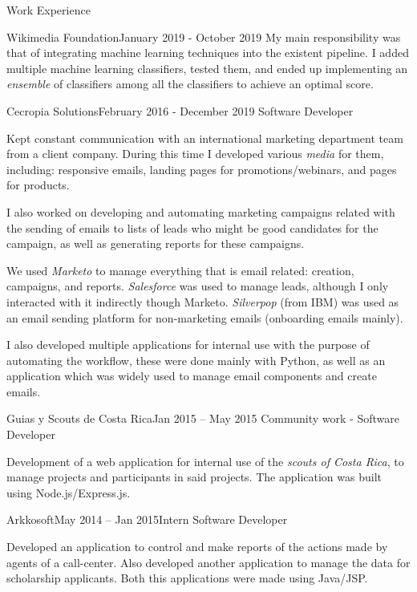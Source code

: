 \documentclass{resume} %
\begin{document}
\begin{rSection}{Work Experience}
\begin{rSubsection}{Wikimedia Foundation}{January 2019 - October 2019}
My main responsibility was that of integrating machine learning techniques into the existent pipeline. I added multiple machine learning classifiers, tested them, and ended up implementing an \textit{ensemble} of classifiers among all the classifiers to achieve an optimal score.
\end{rSubsection}

\begin{rSubsection}{Cecropia Solutions}{February 2016 - December 2019}
{Software Developer}{}
\item[] Kept constant communication with an international marketing department team from a client company. During this time I developed various \textit{media} for them, including: responsive emails, landing pages for promotions/webinars, and pages for products. 

I also worked on developing and automating marketing campaigns related with the sending of emails to lists of leads who might be good candidates for the campaign, as well as generating reports for these campaigns.

We used \textit{Marketo} to manage everything that is email related: creation, campaigns, and reports. \textit{Salesforce} was used to manage leads, although I only interacted with it indirectly though Marketo. \textit{Silverpop} (from IBM) was used as an email sending platform for non-marketing emails (onboarding emails mainly).

I also developed multiple applications for internal use with the purpose of automating the workflow, these were done mainly with Python, as well as an application which was widely used to manage email components and create emails.
\end{rSubsection}


\begin{rSubsection}{Guias y Scouts de Costa Rica}{Jan 2015 – May 2015}
{Community work - Software Developer}{}
\item[] Development of a web application for internal use of the \textit{scouts of Costa Rica}, to manage projects and participants in said projects. The application was built using Node.js/Express.js.
\end{rSubsection}


\begin{rSubsection}{Arkkosoft}{May 2014 – Jan 2015}{Intern Software Developer}{}
\item[] Developed an application to control and make reports of the actions made by agents of a call-center. Also developed another application to manage the data for scholarship applicants. Both this applications were made using Java/JSP.
\end{rSubsection}

\end{rSection}
\end{document}
